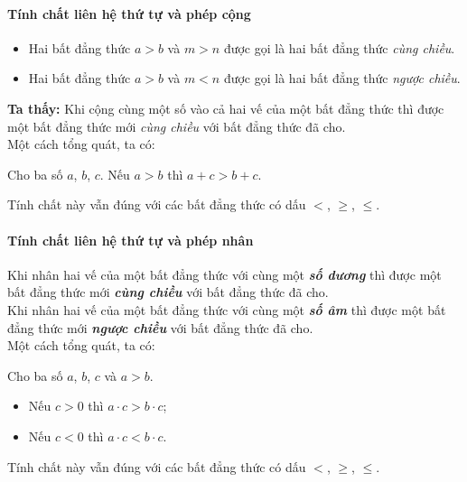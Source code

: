 \begin{tomtat}
\paragraph{Tính chất liên hệ thứ tự và phép cộng}
\begin{boxdn}
	\begin{itemize}
	\item Hai bất đẳng thức $a>b$ và $m>n$ được gọi là hai bất đẳng thức \textit{cùng chiều}.
	\item Hai bất đẳng thức $a>b$ và $m<n$ được gọi là hai bất đẳng thức \textit{ngược chiều}.
	\end{itemize}
	\textbf{Ta thấy:} Khi cộng cùng một số vào cả hai vế của một bất đẳng thức thì được một bất đẳng thức mới \textit{cùng chiều} với bất đẳng thức đã cho.\\
	Một cách tổng quát, ta có:
	\begin{tc}
	Cho ba số $a$, $b$, $c$. Nếu $a>b$ thì $a+c>b+c$.
	\end{tc}
\end{boxdn}
\begin{note}
	Tính chất này vẫn đúng với các bất đẳng thức có dấu $<$, $\geq$, $\leq$.
\end{note}
\paragraph{Tính chất liên hệ thứ tự và phép nhân}
\begin{boxdn}
	Khi nhân hai vế của một bất đẳng thức với cùng một \textbf{\textit{số dương}} thì được một bất đẳng thức mới \textbf{\textit{cùng chiều}} với bất đẳng thức đã cho.\\	
	Khi nhân hai vế của một bất đẳng thức với cùng một \textbf{\textit{số âm}} thì được một bất đẳng thức mới \textbf{\textit{ngược chiều}} với bất đẳng thức đã cho.\\
	Một cách tổng quát, ta có:
	\begin{tc}
	Cho ba số $a$, $b$, $c$ và $a>b$.
	\begin{itemize}
	\item Nếu $c>0$ thì $a\cdot c > b\cdot c$;
	\item Nếu $c<0$ thì $a\cdot c < b\cdot c$.
	\end{itemize}
	\end{tc}
\end{boxdn}
\begin{note}
	Tính chất này vẫn đúng với các bất đẳng thức có dấu $<$, $\geq$, $\leq$.
\end{note}	
\end{tomtat}
